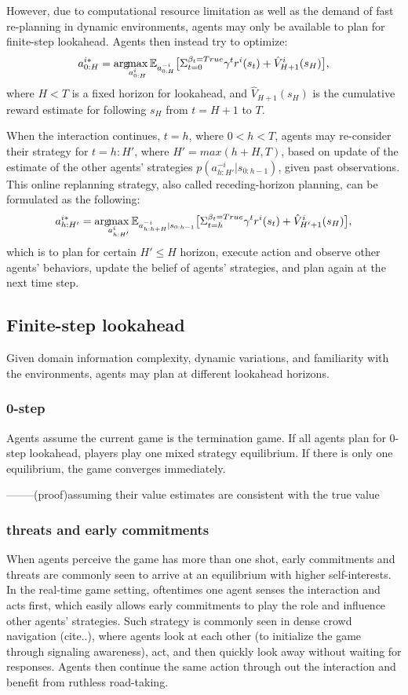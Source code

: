 \documentclass[letterpaper, 10 pt, conference]{ieeeconf}  %
\newcommand{\argmax}{\arg\!\!\max}
\begin{document}
However, due to computational resource limitation as well as the demand of fast re-planning in dynamic environments, agents may only be available to plan for finite-step lookahead. Agents then instead try to optimize:
\begin{equation}
    a^{i*}_{0:H} = \argmax_{a^i_{0:H}} \mathbb{E}_{a^{-i}_{0:H}} \big{[}\Sigma_{t=0}^{\beta_t=True} \gamma^t r^i(s_t) + \hat{V}^i_{H+1}(s_H)\big{]}, 
\end{equation}
where $H< T$ is a fixed horizon for lookahead, and $\hat{V}_{H+1}(s_H)$ is the cumulative reward estimate for following $s_H$ from $t=H+1$ to $T$.

When the interaction continues, $t=h$, where $0<h<T$, agents may re-consider their strategy for $t=h:H'$, where $H'=max(h+H,T)$, based on update of the estimate of the other agents' strategies $p(a^{-i}_{h:H'}|s_{0:h-1})$, given past observations. This online replanning strategy, also called receding-horizon planning, can be formulated as the following:
\begin{equation}
    a^{i*}_{h:H'} = \argmax_{a^i_{h:H'}} \mathbb{E}_{a^{-i}_{h:h+H}|s_{0:h-1}} \big{[}\Sigma_{t=h}^{\beta_t=True} \gamma^t r^i(s_t) + \hat{V}^i_{H'+1}(s_H)\big{]}, 
\end{equation}
which is to plan for certain $H'\leq H$ horizon, execute action and observe other agents' behaviors, update the belief of agents' strategies, and plan again at the next time step.

\subsection{Finite-step lookahead}
Given domain information complexity, dynamic variations, and familiarity with the environments, agents may plan at different lookahead horizons. 
\subsubsection{0-step}
Agents assume the current game is the termination game. If all agents plan for 0-step lookahead, players play one mixed strategy equilibrium. If there is only one equilibrium, the game converges immediately.  

--------(proof)assuming their value estimates are consistent with the true value

\subsubsection{threats and early commitments}
When agents perceive the game has more than one shot, early commitments and threats are commonly seen to arrive at an equilibrium with higher self-interests. In the real-time game setting, oftentimes one agent senses the interaction and acts first, which easily allows early commitments to play the role and influence other agents' strategies. Such strategy is commonly seen in dense crowd navigation (cite..), where agents look at each other (to initialize the game through signaling awareness), act, and then quickly look away without waiting for responses. Agents then continue the same action through out the interaction and benefit from ruthless road-taking. 
\end{document}
